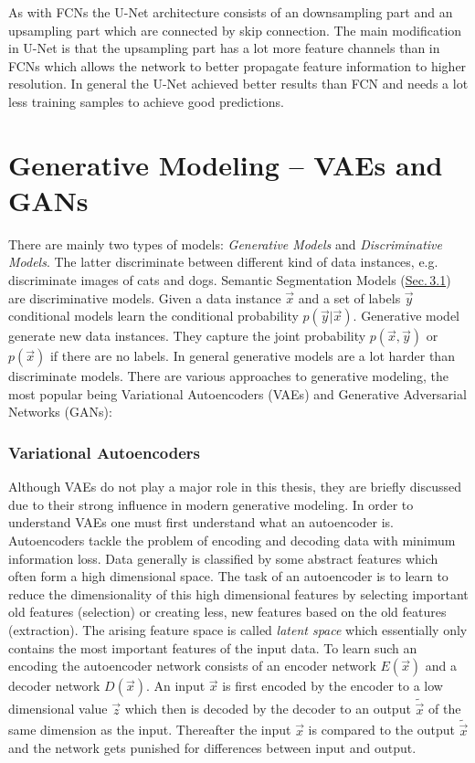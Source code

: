 As with FCNs the U-Net architecture consists of an downsampling part and an upsampling part which are connected by skip connection. The main modification in U-Net is that the upsampling part has a lot more feature channels than in FCNs which allows the network to better propagate feature information to higher resolution. In general the U-Net achieved better results than FCN and needs a lot less training samples to achieve good predictions.

\section[Generative Modeling – VAEs and GANs]{Generative Modeling – VAEs and GANs%
    }
There are mainly two types of models: \textit{Generative Models} and \textit{Discriminative Models}. The latter discriminate between different kind of data instances, e.g. discriminate images of cats and dogs. Semantic Segmentation Models (\hyperref[sec:3.1]{Sec.\,3.1}) are discriminative models. Given a data instance $\vec{x}$ and a set of labels $\vec{y}$ conditional models learn the conditional probability $p(\vec{y}|\vec{x})$. Generative model generate new data instances. They capture the joint probability $p(\vec{x},\vec{y})$ or $p(\vec{x})$ if there are no labels. In general generative models are a lot harder than discriminate models. There are various approaches to generative modeling, the most popular being Variational Autoencoders (VAEs) and Generative Adversarial Networks (GANs):

\subsubsection{Variational Autoencoders}
Although VAEs \cite{vae_original} do not play a major role in this thesis, they are briefly discussed due to their strong influence in modern generative modeling. In order to understand VAEs one must first understand what an autoencoder is. Autoencoders tackle the problem of encoding and decoding data with minimum information loss. Data generally is classified by some abstract features which often form a high dimensional space. The task of an autoencoder is to learn to reduce the dimensionality of this high dimensional features by selecting important old features (selection) or creating less, new features based on the old features (extraction). The arising feature space is called \textit{latent space} which essentially only contains the most important features of the input data. To learn such an encoding the autoencoder network consists of an encoder network $E(\vec{x})$ and a decoder network $D(\vec{x})$. An input $\vec{x}$ is first encoded by the encoder to a low dimensional value $\vec{z}$ which then is decoded by the decoder to an output $\tilde{\vec{x}}$ of the same dimension as the input. Thereafter the input $\vec{x}$ is compared to the output $\tilde{\vec{x}}$ and the network gets punished for differences between input and output.

